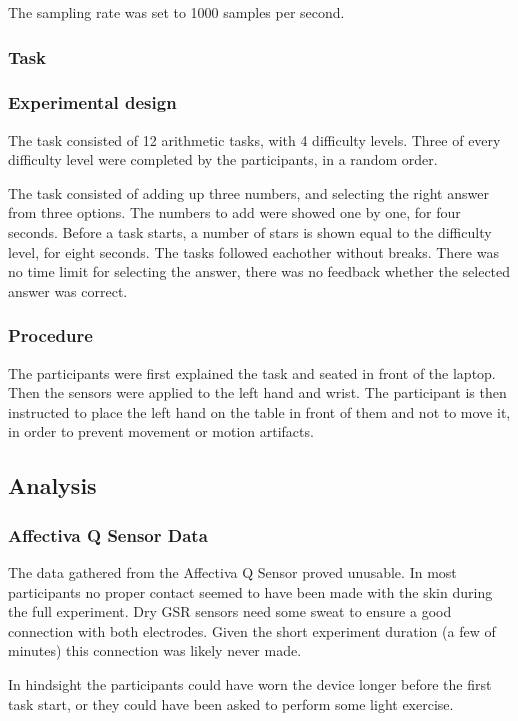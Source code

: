 \documentclass[12pt,fleqn,leqno,letterpaper]{article}
\begin{document}
The sampling rate was set to 1000 samples per second.

\subsubsection{Task}

\subsubsection{Experimental design}
The task consisted of 12 arithmetic tasks, with 4 difficulty levels. Three of every difficulty level were completed by the participants, in a random order. 

The task consisted of adding up three numbers, and selecting the right answer from three options. The numbers to add were showed one by one, for four seconds. Before a task starts, a number of stars is shown equal to the difficulty level, for eight seconds. The tasks followed eachother without breaks. There was no time limit for selecting the answer, there was no feedback whether the selected answer was correct.


\subsubsection{Procedure}
The participants were first explained the task and seated in front of the laptop. Then the sensors were applied to the left hand and wrist. The participant is then instructed to place the left hand on the table in front of them and not to move it, in order to prevent movement or motion artifacts.

\subsection{Analysis}

\subsubsection{Affectiva Q Sensor Data}
The data gathered from the Affectiva Q Sensor proved unusable. In most participants no proper contact seemed to have been made with the skin during the full experiment. Dry GSR sensors need some sweat to ensure a good connection with both electrodes. Given the short experiment duration (a few of minutes) this connection was likely never made.

In hindsight the participants could have worn the device longer before the first task start, or they could have been asked to perform some light exercise. 
\end{document}
